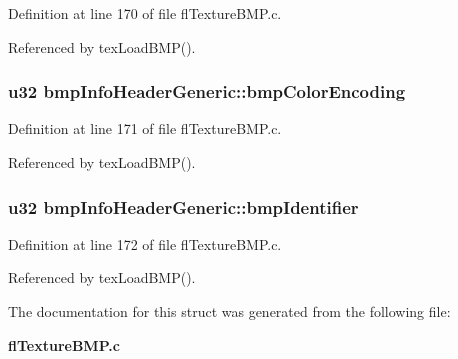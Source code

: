 Definition at line 170 of file fl\-Texture\-BMP.c.

Referenced by tex\-Load\-BMP().
\subsubsection{\setlength{\rightskip}{0pt plus 5cm}u32 {\bf bmp\-Info\-Header\-Generic::bmp\-Color\-Encoding}}\label{structbmpInfoHeaderGeneric_03640e4bb6a28f4f96fb79f94e9d709b}




Definition at line 171 of file fl\-Texture\-BMP.c.

Referenced by tex\-Load\-BMP().
\subsubsection{\setlength{\rightskip}{0pt plus 5cm}u32 {\bf bmp\-Info\-Header\-Generic::bmp\-Identifier}}\label{structbmpInfoHeaderGeneric_00b6ffcba1034bbca3879b8b63732524}




Definition at line 172 of file fl\-Texture\-BMP.c.

Referenced by tex\-Load\-BMP().

The documentation for this struct was generated from the following file:\begin{CompactItemize}
\item 
{\bf fl\-Texture\-BMP.c}\end{CompactItemize}
